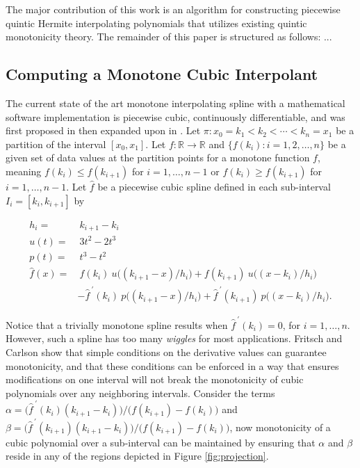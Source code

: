 \documentclass{scspaperproc}
\theoremstyle{scsthe}
\begin{document}

The major contribution of this work is an algorithm for constructing piecewise quintic Hermite interpolating polynomials that utilizes existing quintic monotonicity theory. The remainder of this paper is structured as follows: ...


\subsection{Computing a Monotone Cubic Interpolant}

The current state of the art monotone interpolating spline with a mathematical software implementation is piecewise cubic, continuously differentiable, and was first proposed in \cite{fritsch1980monotone} then expanded upon in \cite{carlson1985monotone}. Let $\pi: x_0 = k_1 < k_2 < \cdots < k_n = x_1$ be a partition of the interval $[x_0,x_1]$. Let $f: \mathbb{R} \rightarrow \mathbb{R}$ and $\{f(k_i) : i = 1,2,\ldots,n\}$ be a given set of data values at the partition points for a monotone function $f$, meaning $f(k_i) \leq f(k_{i+1})$ for $i = 1, \ldots, n-1$ or $f(k_i) \geq f(k_{i+1})$ for $i = 1, \ldots, n-1$. Let $\hat f$ be a piecewise cubic spline defined in each sub-interval $I_i = [k_i, k_{i+1}]$ by

\begin{align*}
h_i =& \ k_{i+1} - k_{i} \\
u(t) =& \ 3t^2 - 2t^3 \\
p(t) =& \ t^3 - t^2 \\
\hat f(x) =& \ f(k_i)\ u\big((k_{i+1} - x) / h_i\big) + f(k_{i+1})\ u\big((x - k_i) / h_i\big) \\
& - \hat f^{\ \prime}(k_i)\ p\big((k_{i+1}-x)/h_i\big) + \hat f^{\ \prime}(k_{i+1})\ p\big((x-k_i)/h_i \big).
\end{align*}

Notice that a trivially monotone spline results when $\hat f^{\ \prime}(k_i) = 0$, for $i = 1, \ldots, n$. However, such a spline has too many \textit{wiggles} for most applications. Fritsch and Carlson show that simple conditions on the derivative values can guarantee monotonicity, and that these conditions can be enforced in a way that ensures modifications on one interval will not break the monotonicity of cubic polynomials over any neighboring intervals. Consider the terms $\alpha = \big(\hat f^{\ \prime}(k_i) (k_{i+1}-k_i)\big) / \big(f(k_{i+1}) - f(k_i)\big)$ and $\beta = \big(\hat f^{\ \prime}(k_{i+1}) (k_{i+1}-k_i)\big) / \big(f(k_{i+1}) - f(k_i)\big)$, now monotonicity of a cubic polynomial over a sub-interval can be maintained by ensuring that $\alpha$ and $\beta$ reside in any of the regions depicted in Figure \ref{fig:projection}.
\end{document}
